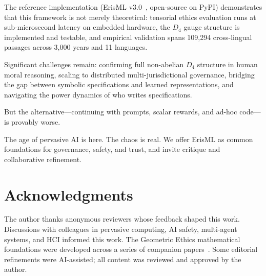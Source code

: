 \documentclass[conference]{IEEEtran}
\begin{document}
The reference implementation (ErisML v3.0~\cite{bond2026erisml}, open-source on PyPI) demonstrates that this framework is not merely theoretical: tensorial ethics evaluation runs at sub-microsecond latency on embedded hardware, the $D_4$ gauge structure is implemented and testable, and empirical validation spans 109,294 cross-lingual passages across 3,000 years and 11 languages.

Significant challenges remain: confirming full non-abelian $D_4$ structure in human moral reasoning, scaling to distributed multi-jurisdictional governance, bridging the gap between symbolic specifications and learned representations, and navigating the power dynamics of who writes specifications.

But the alternative---continuing with prompts, scalar rewards, and ad-hoc
code---is provably worse.

The age of pervasive AI is here. The chaos is real. We offer ErisML
as common foundations for governance, safety,
and trust, and invite critique and collaborative refinement.

\section*{Acknowledgments}

The author thanks anonymous reviewers whose feedback shaped this work.
Discussions with colleagues in pervasive computing, AI safety,
multi-agent systems, and HCI informed this work. The Geometric Ethics
mathematical foundations were developed across a series of companion papers~\cite{bond2026noether,bond2026diffgeom,bond2026stratified,bond2026noescape,bond2026deme2}. Some editorial refinements were AI-assisted; all content was reviewed and approved by the author.


\end{document}
